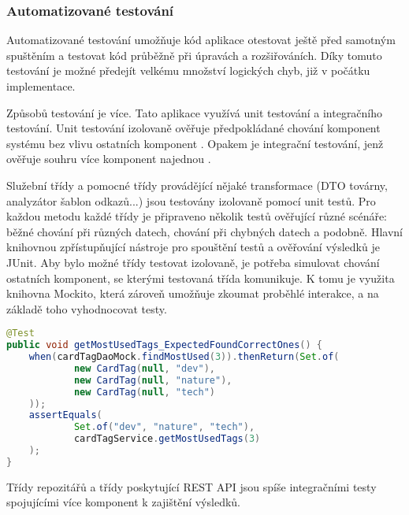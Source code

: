 
		\subsubsection{Automatizované testování}

		Automatizované testování umožňuje kód aplikace otestovat ještě před samotným spuštěním a testovat
		kód průběžně při úpravách a rozšiřováních.
		Díky tomuto testování je možné předejít velkému množství logických chyb, již v počátku implementace.

		Způsobů testování je více.
		Tato aplikace využívá unit testování a integračního testování.
		Unit testování izolovaně ověřuje předpokládané chování komponent systému bez vlivu
		ostatních komponent \cite{unit_testing}.
		Opakem je integrační testování, jenž ověřuje souhru více komponent najednou \cite{integration_testing}.

		Služební třídy a pomocné třídy provádějící nějaké transformace (\ac{DTO} továrny, analyzátor šablon odkazů...)
		jsou testovány izolovaně pomocí unit testů.
		Pro každou metodu každé třídy je připraveno několik testů ověřující různé scénáře: běžné chování při různých datech,
		chování při chybných datech a podobně.
		Hlavní knihovnou zpřístupňující nástroje pro spouštění testů a ověřování výsledků je JUnit.
		Aby bylo možné třídy testovat izolovaně, je potřeba simulovat chování ostatních komponent, se kterými testovaná
		třída komunikuje.
		K tomu je využita knihovna Mockito, která zároveň umožňuje zkoumat proběhlé interakce, a na základě toho vyhodnocovat testy.

		\begin{lstlisting}[language=Java, caption={Ukázka testu ověřující, že služba štítků vrací správné nejvyužívanější štítky z nasimulovaného repozitáře. Zdroj: [autor]}]
@Test
public void getMostUsedTags_ExpectedFoundCorrectOnes() {
	when(cardTagDaoMock.findMostUsed(3)).thenReturn(Set.of(
			new CardTag(null, "dev"),
			new CardTag(null, "nature"),
			new CardTag(null, "tech")
	));
	assertEquals(
			Set.of("dev", "nature", "tech"),
			cardTagService.getMostUsedTags(3)
	);
}
		\end{lstlisting}

		Třídy repozitářů a třídy poskytující \ac{REST} \ac{API} jsou spíše integračními testy spojujícími více
		komponent k zajištění výsledků.

